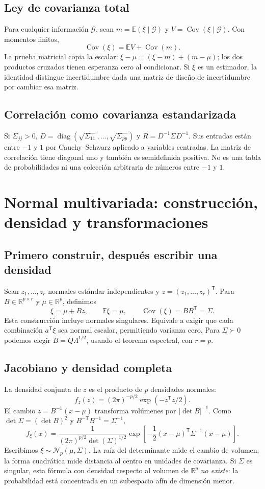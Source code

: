 \documentclass[11pt,a4paper]{article}
\newcommand{\R}{\mathbb R}
\newcommand{\E}{\mathbb E}
\newcommand{\T}{^{\mathsf T}}
\DeclareMathOperator{\Cov}{Cov}
\DeclareMathOperator{\diag}{diag}
\theoremstyle{definition}
\begin{document}
\subsection{Ley de covarianza total}
Para cualquier información $\mathcal G$, sean $m=\E(\xi\mid\mathcal G)$ y $V=\Cov(\xi\mid\mathcal G)$. Con momentos finitos,
\[
\boxed{\Cov(\xi)=\E V+\Cov(m)}.
\]
La prueba matricial copia la escalar: $\xi-\mu=(\xi-m)+(m-\mu)$; los dos productos cruzados tienen esperanza cero al condicionar. Si $\xi$ es un estimador, la identidad distingue incertidumbre dada una matriz de diseño de incertidumbre por cambiar esa matriz.
\subsection{Correlación como covarianza estandarizada}
Si $\Sigma_{jj}>0$, $D=\diag(\sqrt{\Sigma_{11}},\ldots,\sqrt{\Sigma_{pp}})$ y $R=D^{-1}\Sigma D^{-1}$. Sus entradas están entre $-1$ y $1$ por Cauchy--Schwarz aplicado a variables centradas. La matriz de correlación tiene diagonal uno y también es semidefinida positiva. No es una tabla de probabilidades ni una colección arbitraria de números entre $-1$ y $1$.

\section{Normal multivariada: construcción, densidad y transformaciones}
\subsection{Primero construir, después escribir una densidad}
Sean $z_1,\ldots,z_r$ normales estándar independientes y $z=(z_1,\ldots,z_r)\T$. Para $B\in\R^{p\times r}$ y $\mu\in\R^p$, definimos
\[
\xi=\mu+Bz,\qquad\E\xi=\mu,\qquad\Cov(\xi)=BB\T=\Sigma.
\]
Esta construcción incluye normales singulares. Equivale a exigir que cada combinación $a\T\xi$ sea normal escalar, permitiendo varianza cero. Para $\Sigma\succ0$ podemos elegir $B=Q\Lambda^{1/2}$, usando el teorema espectral, con $r=p$.
\subsection{Jacobiano y densidad completa}
La densidad conjunta de $z$ es el producto de $p$ densidades normales:
\[
f_z(z)=(2\pi)^{-p/2}\exp(-z\T z/2).
\]
El cambio $z=B^{-1}(x-\mu)$ transforma volúmenes por $|\det B|^{-1}$. Como $\det\Sigma=(\det B)^2$ y $B^{-\mathsf T}B^{-1}=\Sigma^{-1}$,
\[
\boxed{f_\xi(x)=\frac{1}{(2\pi)^{p/2}\det(\Sigma)^{1/2}}
\exp\!\left[-\frac12(x-\mu)\T\Sigma^{-1}(x-\mu)\right]}.
\]
Escribimos $\xi\sim\mathcal N_p(\mu,\Sigma)$. La raíz del determinante mide el cambio de volumen; la forma cuadrática mide distancia al centro en unidades de covarianza. Si $\Sigma$ es singular, esta fórmula con densidad respecto al volumen de $\R^p$ \emph{no existe}: la probabilidad está concentrada en un subespacio afín de dimensión menor.
\end{document}
